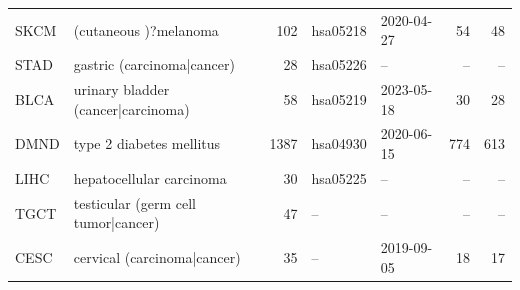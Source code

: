 \begin{table}[h]
\begin{tabular}{llrllrr}
SKCM & (cutaneous )?melanoma & 102 & hsa05218 & 2020-04-27 & 54 & 48\\
STAD & gastric (carcinoma|cancer) & 28 & hsa05226 & -- & -- & --\\
BLCA & urinary bladder (cancer|carcinoma) & 58 & hsa05219 & 2023-05-18 & 30 & 28\\
DMND & type 2 diabetes mellitus & 1387 & hsa04930 & 2020-06-15 & 774 & 613\\
LIHC & hepatocellular carcinoma & 30 & hsa05225 & -- & -- & --\\
TGCT & testicular (germ cell tumor|cancer) & 47 & -- & -- & -- & --\\
CESC & cervical (carcinoma|cancer) & 35 & -- & 2019-09-05 & 18 & 17\\
\bottomrule\end{tabular}\end{table}
